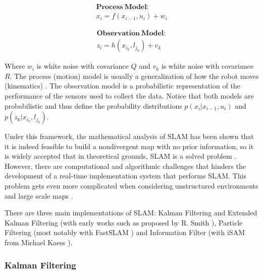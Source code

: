 \documentclass[12pt]{article}
\begin{document}
\begin{minipage}{.48\linewidth}
\centering
\begin{equation*}
\begin{split}
\mathbf{Process\ Model:} \\ 
x_i = f(x_{i-1}, u_i) + w_i
\end{split}
\end{equation*}
\end{minipage}
\begin{minipage}{.48\linewidth}
\centering
\begin{equation*}
\begin{split}
\mathbf{Observation\ Model:} \\ 
z_i = h(x_{i_k}, l_{j_k}) + v_k
\end{split}
\end{equation*}
\end{minipage}
	
Where $w_i$ is white noise with covariance $Q$ and $v_k$ is white noise with covariance $R$. The process (motion) model is usually a generalization of how the robot moves (kinematics) \cite{Montemerlo02fastslam:a}\cite{772544}. The observation model is a probabilistic representation of the performance of the sensors used to collect the data. Notice that both models are probabilistic and thus define the probability distributions $p(x_i|x_{i-1},u_i)$ and $p(z_k|x_{i_k},l_{j_k})$.

Under this framework, the mathematical analysis of SLAM has been shown that it is indeed feasible to build a nondivergent map with no prior information, so it is widely accepted that in theoretical grounds, SLAM is a solved problem \cite{SLAMPartI}\cite{Cadena}\cite{CsorbaThesis}\cite{938381}. However, there are computational and algorithmic challenges that hinders the development of a real-time implementation system that performs SLAM. This problem gets even more complicated when considering unstructured environments and large scale maps \cite{SLAMPartII}.
	
There are three main implementations of SLAM: Kalman Filtering and Extended Kalman Filtering (with early works such as proposed by R. Smith \cite{Smith:1990:EUS:93002.93291}), Particle Filtering (most notably with FastSLAM \cite{Montemerlo02fastslam:a}) and Information Filter (with iSAM from Michael Kaess \cite{Kaess08tro}).

	\subsubsection{Kalman Filtering}
\end{document}
